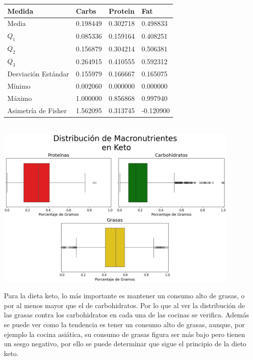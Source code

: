 \documentclass[12pt,a4paper]{article}
\begin{document}
{{{            \begin{center}
                \begin{tabular}{l|lll}
                    \toprule
                        Medida & Carbs & Protein & Fat \\
                    \midrule
                        Media               & 0.198449 & 0.302718 & 0.498833 \\
                        $Q_1$               & 0.085336 & 0.159164 & 0.408251 \\
                        $Q_2$               & 0.156879 & 0.304214 & 0.506381 \\
                        $Q_3$               & 0.264915 & 0.410555 & 0.592312 \\
                        Desviación Estándar & 0.155979 & 0.166667 & 0.165075 \\
                        Mínimo              & 0.002060 & 0.000000 & 0.000000 \\
                        Máximo              & 1.000000 & 0.856868 & 0.997940 \\
                        Asimetría de Fisher & 1.562095 & 0.313745 & -0.120900 \\
                    \bottomrule
                \end{tabular}\\
                \vspace{0.5cm}
                \includegraphics[width=0.9\textwidth]{Resources/EDA/Keto_1.png}
            \end{center}

            Para la dieta keto, lo más importante es mantener un consumo alto de grasas, o 
            por al menos mayor que el de carbohidratos. Por lo que al ver la distribución de 
            las grasas contra los carbohidratos en cada una de las cocinas se verifica. 
            Además se puede ver como la tendencia es tener un consumo alto de grasas, aunque, por 
            ejemplo la cocina asiática, su consumo de grasas figura ser más bajo pero tienen 
            un sesgo negativo, por ello se puede determinar que sigue el principio de la dieto keto.

}}}
\end{document}
